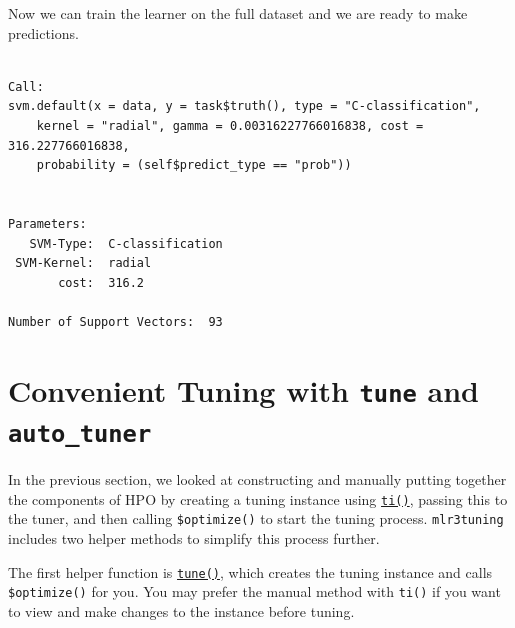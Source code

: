 Now we can train the learner on the full dataset and we are ready to
make predictions.

\begin{Shaded}
\begin{Highlighting}[]
\SpecialCharTok{$}\SpecialCharTok{$}
\end{Highlighting}
\end{Shaded}

\begin{verbatim}

Call:
svm.default(x = data, y = task$truth(), type = "C-classification", 
    kernel = "radial", gamma = 0.00316227766016838, cost = 316.227766016838, 
    probability = (self$predict_type == "prob"))


Parameters:
   SVM-Type:  C-classification 
 SVM-Kernel:  radial 
       cost:  316.2 

Number of Support Vectors:  93
\end{verbatim}

\hypertarget{sec-autotuner}{%
\section{\texorpdfstring{Convenient Tuning with \texttt{tune} and
\texttt{auto\_tuner}}{Convenient Tuning with tune and auto\_tuner}}\label{sec-autotuner}}

In the previous section, we looked at constructing and manually putting
together the components of HPO by creating a tuning instance using
\href{https://mlr3tuning.mlr-org.com/reference/ti.html}{\texttt{ti()}},
passing this to the tuner, and then calling \texttt{\$optimize()} to
start the tuning process. \texttt{mlr3tuning} includes two helper
methods to simplify this process further.

The first helper function is
\href{https://mlr3tuning.mlr-org.com/reference/tune.html}{\texttt{tune()}},
which creates the tuning instance and calls \texttt{\$optimize()} for
you. You may prefer the manual method with \texttt{ti()} if you want to
view and make changes to the instance before tuning.

